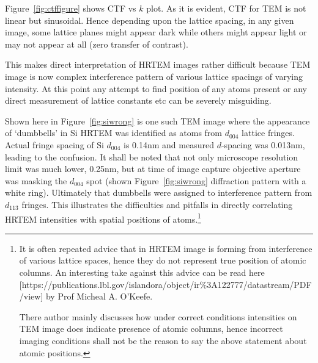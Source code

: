 Figure~\ref{fig:ctffigure} shows CTF vs $k$ plot.
As it is evident, CTF for TEM is not linear but sinusoidal.
Hence depending upon the lattice spacing, in any given image, some lattice planes might appear dark while others might appear light or may not appear at all (zero transfer of contrast).

This makes direct interpretation of HRTEM images rather difficult because TEM image is now complex interference pattern of various lattice spacings of varying intensity. 
At this point any attempt to find position of any atoms present or any direct measurement of lattice constants etc can be severely misguiding.

Shown here in Figure~\ref{fig:siwrong} is one such TEM image where the appearance of `dumbbells' in Si HRTEM was identified as atoms from $d_{004}$ lattice fringes.
Actual fringe spacing of Si $d_{004}$ is 0.14nm and measured $d$-spacing was 0.013nm, leading to the confusion.
It shall be noted that not only microscope resolution limit was much lower, 0.25nm, but at time of image capture objective aperture was masking the $d_{004}$ spot (shown Figure~\ref{fig:siwrong} diffraction pattern with a white ring).
Ultimately that dumbbells were assigned to interference pattern from $d_{113}$ fringes.
This illustrates the difficulties and pitfalls in directly correlating HRTEM intensities with spatial positions of atoms.\footnote{It is often repeated advice that in HRTEM image is forming from interference of various lattice spaces, hence they do not represent true position of atomic columns. An interesting take against this advice can be read here [https://publications.lbl.gov/islandora/object/ir\%3A122777/datastream/PDF/view] by Prof Micheal A. O'Keefe. 

There author mainly discusses how under correct conditions intensities on TEM image does indicate presence of atomic columns, hence incorrect imaging conditions shall not be the reason to say the above statement about atomic positions.}


